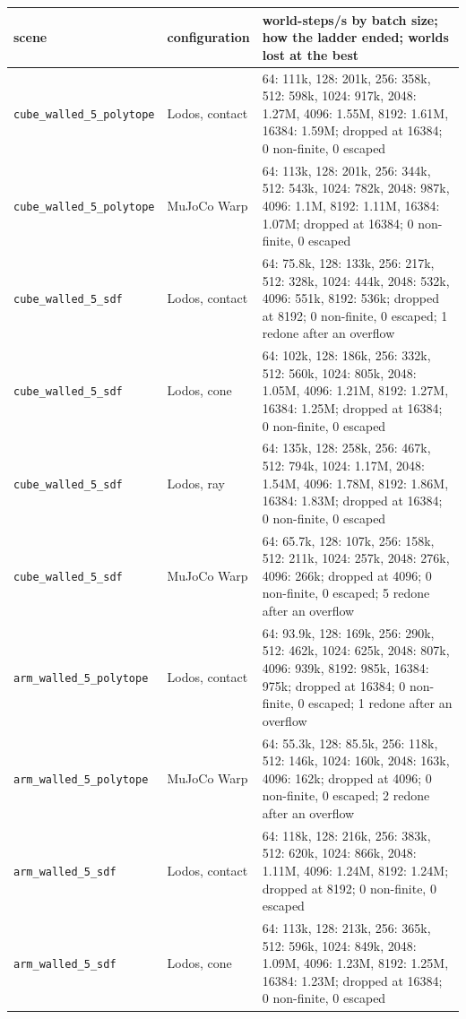 \begin{longtable}{@{}llp{9.5cm}@{}}
\toprule
scene & configuration & world-steps/s by batch size; how the ladder ended; worlds lost at the best \\
\midrule
\endhead
\texttt{cube\_walled\_5\_polytope} & Lodos, contact & 64: 111k, 128: 201k, 256: 358k, 512: 598k, 1024: 917k, 2048: 1.27M, 4096: 1.55M, 8192: 1.61M, 16384: 1.59M; dropped at 16384; 0 non-finite, 0 escaped \\
\texttt{cube\_walled\_5\_polytope} & MuJoCo Warp & 64: 113k, 128: 201k, 256: 344k, 512: 543k, 1024: 782k, 2048: 987k, 4096: 1.1M, 8192: 1.11M, 16384: 1.07M; dropped at 16384; 0 non-finite, 0 escaped \\
\texttt{cube\_walled\_5\_sdf} & Lodos, contact & 64: 75.8k, 128: 133k, 256: 217k, 512: 328k, 1024: 444k, 2048: 532k, 4096: 551k, 8192: 536k; dropped at 8192; 0 non-finite, 0 escaped; 1 redone after an overflow \\
\texttt{cube\_walled\_5\_sdf} & Lodos, cone & 64: 102k, 128: 186k, 256: 332k, 512: 560k, 1024: 805k, 2048: 1.05M, 4096: 1.21M, 8192: 1.27M, 16384: 1.25M; dropped at 16384; 0 non-finite, 0 escaped \\
\texttt{cube\_walled\_5\_sdf} & Lodos, ray & 64: 135k, 128: 258k, 256: 467k, 512: 794k, 1024: 1.17M, 2048: 1.54M, 4096: 1.78M, 8192: 1.86M, 16384: 1.83M; dropped at 16384; 0 non-finite, 0 escaped \\
\texttt{cube\_walled\_5\_sdf} & MuJoCo Warp & 64: 65.7k, 128: 107k, 256: 158k, 512: 211k, 1024: 257k, 2048: 276k, 4096: 266k; dropped at 4096; 0 non-finite, 0 escaped; 5 redone after an overflow \\
\texttt{arm\_walled\_5\_polytope} & Lodos, contact & 64: 93.9k, 128: 169k, 256: 290k, 512: 462k, 1024: 625k, 2048: 807k, 4096: 939k, 8192: 985k, 16384: 975k; dropped at 16384; 0 non-finite, 0 escaped; 1 redone after an overflow \\
\texttt{arm\_walled\_5\_polytope} & MuJoCo Warp & 64: 55.3k, 128: 85.5k, 256: 118k, 512: 146k, 1024: 160k, 2048: 163k, 4096: 162k; dropped at 4096; 0 non-finite, 0 escaped; 2 redone after an overflow \\
\texttt{arm\_walled\_5\_sdf} & Lodos, contact & 64: 118k, 128: 216k, 256: 383k, 512: 620k, 1024: 866k, 2048: 1.11M, 4096: 1.24M, 8192: 1.24M; dropped at 8192; 0 non-finite, 0 escaped \\
\texttt{arm\_walled\_5\_sdf} & Lodos, cone & 64: 113k, 128: 213k, 256: 365k, 512: 596k, 1024: 849k, 2048: 1.09M, 4096: 1.23M, 8192: 1.25M, 16384: 1.23M; dropped at 16384; 0 non-finite, 0 escaped \\

\end{longtable}

